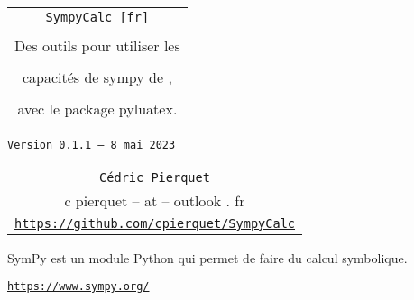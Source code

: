 \documentclass[french,a4paper,11pt]{article}
\def\SCversion{0.1.1}
\def\SCdate{8 mai 2023}
\begin{document}
\setlength{\aweboxleftmargin}{0.07\linewidth}
\setlength{\aweboxcontentwidth}{0.93\linewidth}
\setlength{\aweboxvskip}{8pt}

\pagestyle{fancy}

\thispagestyle{empty}

\vspace{2cm}

\begin{center}
	\begin{minipage}{0.75\linewidth}
	\begin{tcolorbox}[colframe=yellow,colback=yellow!15]
		\begin{center}
			\begin{tabular}{c}
				{\Huge \texttt{SympyCalc [fr]}}\\
				\\
				{\LARGE Des outils pour utiliser les} \\
				\\
				{\LARGE capacités de \textsf{sympy} de \faPython, } \\
				\\
				{\LARGE avec le package \textsf{pyluatex}.} \\
			\end{tabular}
			
			\bigskip
			
			{\small \texttt{Version \SCversion{} -- \SCdate}}
		\end{center}
	\end{tcolorbox}
\end{minipage}
\end{center}

\begin{center}
	\begin{tabular}{c}
	\texttt{Cédric Pierquet}\\
	{\ttfamily c pierquet -- at -- outlook . fr}\\
	\texttt{\url{https://github.com/cpierquet/SympyCalc}}
\end{tabular}
\end{center}

\begin{center}
	\begin{minipage}{0.5\linewidth}
		\begin{tcolorbox}[colframe=DarkBlue!50,colback=DarkBlue!5]
			\begin{center}
				\textsf{SymPy} est un module \textsf{Python} qui permet de faire du calcul symbolique.
				
				\texttt{\url{https://www.sympy.org/}}
			\end{center}
		\end{tcolorbox}
	\end{minipage}
\end{center}
\end{document}
